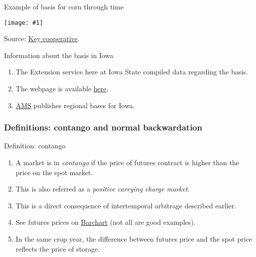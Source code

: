 \documentclass[table,xcolor=pdftex,dvipsnames, handout]{beamer}\usepackage[]{graphicx}\usepackage[]{color}
\newcommand {\framedgraphic}[1] {
        \begin{center}
            \texttt{[image: \#1]}
        \end{center}
        \vspace{-1\baselineskip}
}
\begin{document}

\begin{frame}{Example of basis for corn through time}\label{Corn_basis}
    \framedgraphic{Corn_basis.png}
Source: \href{http://www.keycoop.com/}{Key cooperative}.
\end{frame}


\begin{frame}{Information about the basis in Iowa}
\begin{enumerate}[label=\textbullet]
    \item The Extension service here at Iowa State compiled data regarding the basis.
    \item The webpage is available \href{http://www.extension.iastate.edu/agdm/crops/html/a2-41.html}{here}.
    \item \href{http://www.ams.usda.gov/mnreports/nw_gr110.txt}{AMS} publishes regional bases for Iowa.
\end{enumerate}
\end{frame}


\subsubsection{Definitions: contango and normal backwardation}

\begin{frame}{Definition: contango}
\begin{enumerate}[label=\textbullet]
    \item A market is in \emph{contango} if the price of futures contract is higher than the price on the spot market.
    \item This is also referred as a \emph{positive carrying charge market}.
    \item This is a direct consequence of intertemporal arbitrage described earlier.
    \item See futures prices on \href{http://www.barchart.com/futures/marketoverview}{Barchart} (not all are good examples).
    \item In the same crop year, the difference between futures price and the spot price reflects the price of storage.
\end{enumerate}
\end{frame}
\end{document}
